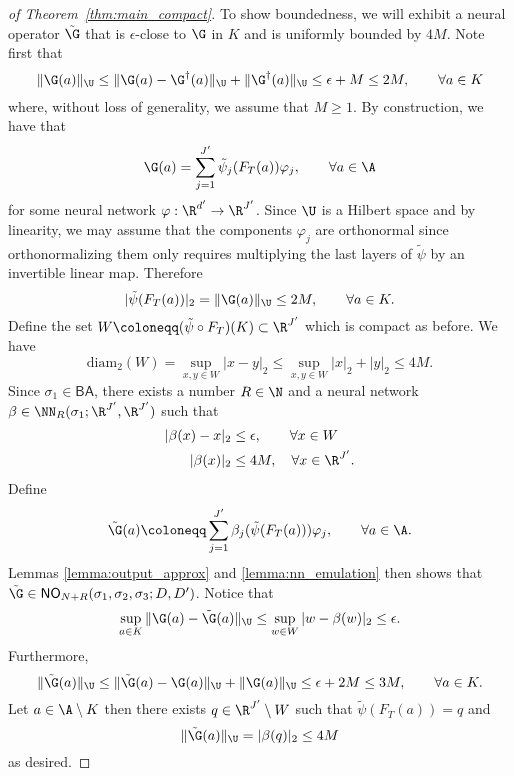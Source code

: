 \begin{proof}[of Theorem~\ref{thm:main_compact}]
To show boundedness, we will exhibit a neural operator \(\tilde{\G}\) that is \(\epsilon\)-close to \(\G\)
in \(K\) and is uniformly bounded by \(4M\). Note first that
\[\|\G(a)\|_\U \leq \|\G(a) - \G^\dagger(a)\|_\U + \|\G^\dagger(a)\|_\U \leq \epsilon + M \leq 2M, \qquad \forall a \in K\]
where, without loss of generality, we assume that \(M \geq 1\). By construction, we have that
\[\G(a) = \sum_{j=1}^{J'} \tilde{\psi}_j(F_T(a)) \varphi_j, \qquad \forall a \in \A\]
for some  neural network \(\varphi : \R^{d'} \to \R^{J'}\). Since \(\U\) is a Hilbert space and 
by linearity, we may assume that the components \(\varphi_j\) are orthonormal since orthonormalizing them 
only requires multiplying the last layers of \(\tilde{\psi}\) by an invertible linear map.
Therefore
\[|\tilde{\psi}(F_T(a))|_2 = \|\G(a)\|_\U \leq 2M, \qquad \forall a \in K.\]
Define the set \(W \coloneqq (\tilde{\psi} \circ F_T)(K) \subset \R^{J'}\) which is compact as before.
We have 
\[\text{diam}_2 (W) = \sup_{x,y \in W} |x-y|_2 \leq \sup_{x,y \in W} |x|_2 + |y|_2 \leq 4M.\]
Since \(\sigma_1 \in \mathsf{BA}\), there exists 
a number \(R \in \N\) and a neural network \(\beta \in \NN_R (\sigma_1;\R^{J'},\R^{J'})\) such that
\begin{align*}
|\beta(x) - x|_2 &\leq \epsilon ,\qquad \forall x \in W \\
|\beta(x)|_2 &\leq 4M, \quad \forall x \in \R^{J'}.
\end{align*}
Define
\[\tilde{\G}(a) \coloneqq \sum_{j=1}^{J'} \beta_j (\tilde{\psi}(F_T(a))) \varphi_j, \qquad \forall a \in \A.\]
Lemmas \ref{lemma:output_approx} and \ref{lemma:nn_emulation} then shows that \(\tilde{\G} \in \mathsf{NO}_{N+R}(\sigma_1,\sigma_2,\sigma_3;D,D')\).
Notice that
\[\sup_{a \in K} \|\G(a) - \tilde{\G}(a)\|_{\U} \leq \sup_{w \in W} |w - \beta(w)|_2 \leq \epsilon.\]
Furthermore,
\[\|\tilde{\G}(a)\|_{\U} \leq \|\tilde{\G}(a) - \G(a)\|_{\U} + \|\G(a)\|_\U \leq \epsilon + 2M \leq 3M, \qquad \forall a \in K.\]
Let \(a \in \A \setminus K\) then there exists \(q \in \R^{J'} \setminus W\) such that \(\tilde{\psi}(F_T(a)) = q\) and 
\[\|\tilde{\G}(a)\|_{\U} = |\beta(q)|_2 \leq 4M\]
as desired.
\end{proof}

\section{}
\label{sec_proof:measurable_approx}

